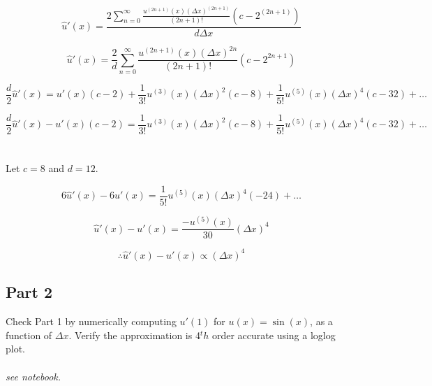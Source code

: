\documentclass{amsart}
\begin{document}
    \[ \hat{u}'(x) = \frac{
    	2\sum_{n=0}^{\infty}\frac{u^{(2n+1)}(x)(\Delta x)^{(2n+1)}}{(2n+1)!}\left( c - 2^{(2n+1)} \right)
    }{d\Delta x}\]

    \[ \hat{u}'(x) = \frac{2}{d} \sum_{n=0}^{\infty} \frac{u^{(2n+1)}(x)(\Delta x)^{2n}}{(2n+1)!}\left( c - 2^{2n+1} \right) 
    \]
    
    \[ \frac{d}{2}\hat{u}'(x) = u'(x)(c-2) + \frac{1}{3!}u^{(3)}(x)(\Delta x)^2(c-8) + \frac{1}{5!}u^{(5)}(x)(\Delta x)^4(c-32) + \dots
    \]
    
    \[ \frac{d}{2}\hat{u}'(x) - u'(x)(c-2) = \frac{1}{3!}u^{(3)}(x)(\Delta x)^2(c-8) + \frac{1}{5!}u^{(5)}(x)(\Delta x)^4(c-32) + \dots
    \]
    \\\\
    Let $c=8$ and $d=12$.
    
    \[ 6\hat{u}'(x) - 6u'(x) = \frac{1}{5!}u^{(5)}(x)(\Delta x)^4(-24) + \dots
    \]
    
    \[ \hat{u}'(x) - u'(x) = \frac{-u^{(5)}(x)}{30} (\Delta x)^4\]
    
    \[\therefore \hat{u}'(x) - u'(x) \propto (\Delta x)^4 \]
    
    \subsection{Part 2}
    Check Part 1 by numerically computing $u'(1)$ for $u(x) = \sin(x)$, as a function of $\Delta x$. Verify the approximation is 4$^th$ order accurate using a loglog plot.
    \\\\
    \textit{see notebook.}
	
\end{document}
